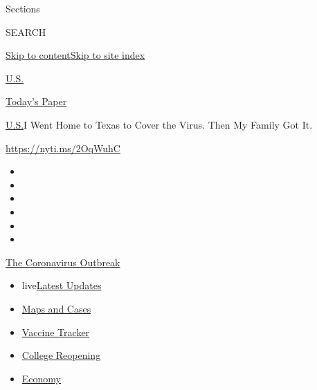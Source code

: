 Sections

SEARCH

\protect\hyperlink{site-content}{Skip to
content}\protect\hyperlink{site-index}{Skip to site index}

\href{https://www.nytimes.com/section/us}{U.S.}

\href{https://myaccount.nytimes.com/auth/login?response_type=cookie\&client_id=vi}{}

\href{https://www.nytimes.com/section/todayspaper}{Today's Paper}

\href{/section/us}{U.S.}\textbar{}I Went Home to Texas to Cover the
Virus. Then My Family Got It.

\url{https://nyti.ms/2OqWuhC}

\begin{itemize}
\item
\item
\item
\item
\item
\item
\end{itemize}

\href{https://www.nytimes.com/news-event/coronavirus?action=click\&pgtype=Article\&state=default\&region=TOP_BANNER\&context=storylines_menu}{The
Coronavirus Outbreak}

\begin{itemize}
\tightlist
\item
  live\href{https://www.nytimes.com/2020/08/04/world/coronavirus-cases.html?action=click\&pgtype=Article\&state=default\&region=TOP_BANNER\&context=storylines_menu}{Latest
  Updates}
\item
  \href{https://www.nytimes.com/interactive/2020/us/coronavirus-us-cases.html?action=click\&pgtype=Article\&state=default\&region=TOP_BANNER\&context=storylines_menu}{Maps
  and Cases}
\item
  \href{https://www.nytimes.com/interactive/2020/science/coronavirus-vaccine-tracker.html?action=click\&pgtype=Article\&state=default\&region=TOP_BANNER\&context=storylines_menu}{Vaccine
  Tracker}
\item
  \href{https://www.nytimes.com/2020/08/02/us/covid-college-reopening.html?action=click\&pgtype=Article\&state=default\&region=TOP_BANNER\&context=storylines_menu}{College
  Reopening}
\item
  \href{https://www.nytimes.com/live/2020/08/04/business/stock-market-today-coronavirus?action=click\&pgtype=Article\&state=default\&region=TOP_BANNER\&context=storylines_menu}{Economy}
\end{itemize}

